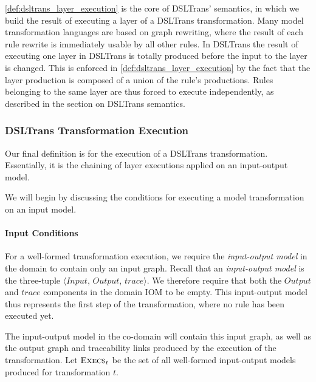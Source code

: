 \cref{def:dsltrans_layer_execution} is the core of DSLTrans' semantics, in which we build the result of executing a layer of a DSLTrans transformation. Many model transformation languages are based on graph rewriting, where the result of each rule rewrite is immediately usable by all other rules. In DSLTrans the result of executing one layer in DSLTrans is totally produced before the input to the layer is changed. This is enforced in \cref{def:dsltrans_layer_execution} by the fact that the layer production is composed of a union of the rule's productions. Rules belonging to the same layer are thus forced to execute independently, as described in the section on DSLTrans semantics.



\subsubsection*{DSLTrans Transformation Execution}

Our final definition is for the execution of a DSLTrans transformation. Essentially, it is the chaining of layer executions applied on an input-output model.

We will begin by discussing the conditions for executing a model transformation on an input model.


\paragraph{Input Conditions}

For a well-formed transformation execution, we require the \textit{input-output model} in the domain to contain only an input graph. Recall that an \textit{input-output model} is the three-tuple $\big\langle \mathit{Input}$, $\mathit{Output}$, $\mathit{trace}\big\rangle$. We therefore require that both the $\mathit{Output}$ and $\mathit{trace}$ components in the domain IOM to be empty. This input-output model thus represents the first step of the transformation, where no rule has been executed yet.

The input-output model in the co-domain will contain this input graph, as well as the output graph and traceability links produced by the execution of the transformation. Let $\textsc{Execs}_t$ be the set of all well-formed input-output models produced for transformation $t$.

